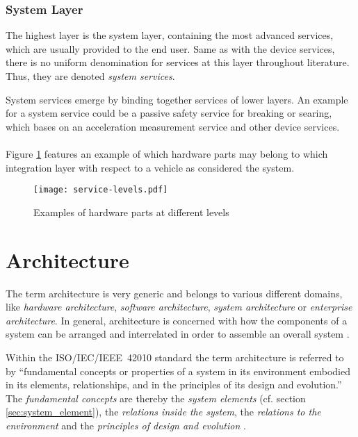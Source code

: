 \subsubsection{System Layer}
The highest layer is the system layer, containing the most advanced services, which are usually provided to the end user. Same as with the device services, there is no uniform denomination for services at this layer throughout literature. Thus, they are denoted \emph{system services}.

System services emerge by binding together services of lower layers. An example for a system service could be a passive safety service for breaking or searing, which bases on an acceleration measurement service and other device services.
\\
\\
Figure \ref{fig:service_levels} features an example of which hardware parts may belong to which integration layer with respect to a vehicle as considered the system. 


\begin{figure}[!htbp]
\centering
\texttt{[image: service-levels.pdf]}
\caption{Examples of hardware parts at different levels \cite{avl}}
\label{fig:service_levels}
\end{figure}







\section{Architecture}

\label{ch:architecture}

The term architecture is very generic and belongs to various different domains, like \emph{hardware architecture}, \emph{software architecture}, \emph{system architecture} or \emph{enterprise architecture}. In general, architecture is concerned with how the components of a system can be arranged and interrelated in order to assemble an overall system \cite{ISO_42010} \cite{ning}. 

Within the \mbox{ISO/IEC/IEEE 42010} standard \cite{ISO_42010} the term architecture is referred to by ``fundamental concepts or properties of a system in its environment embodied in its elements, relationships, and in the principles of its design and evolution.'' The \emph{fundamental concepts} are thereby the \emph{system elements} (cf. section \ref{sec:system_element}), the \emph{relations inside the system}, the \emph{relations to the environment} and the \emph{principles of design and evolution} \cite{ISO_42010}.

